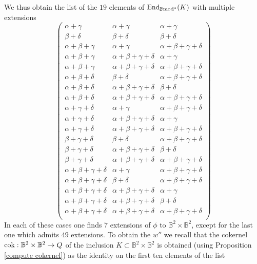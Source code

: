 \documentclass[12pt]{article}
\def\End{{\rm End}}
\def\scoker{{\rm cok}}
\def\B{{\mathbb B}}
\def\End{{\mbox{End}}}
\def\b2{{\rm \B mod^{\mathfrak s}}}
\begin{document}
We thus obtain the  list of the $19$ elements of $\End_\b2(K)$ with multiple extensions
$$
\left(
\begin{array}{ccc}
 \alpha +\gamma  & \alpha +\gamma  & \alpha +\gamma  \\
 \beta +\delta  & \beta +\delta  & \beta +\delta  \\
 \alpha +\beta +\gamma  & \alpha +\gamma  & \alpha +\beta +\gamma +\delta  \\
 \alpha +\beta +\gamma  & \alpha +\beta +\gamma +\delta  & \alpha +\gamma  \\
 \alpha +\beta +\gamma  & \alpha +\beta +\gamma +\delta  & \alpha +\beta +\gamma +\delta  \\
 \alpha +\beta +\delta  & \beta +\delta  & \alpha +\beta +\gamma +\delta  \\
 \alpha +\beta +\delta  & \alpha +\beta +\gamma +\delta  & \beta +\delta  \\
 \alpha +\beta +\delta  & \alpha +\beta +\gamma +\delta  & \alpha +\beta +\gamma +\delta  \\
 \alpha +\gamma +\delta  & \alpha +\gamma  & \alpha +\beta +\gamma +\delta  \\
 \alpha +\gamma +\delta  & \alpha +\beta +\gamma +\delta  & \alpha +\gamma  \\
 \alpha +\gamma +\delta  & \alpha +\beta +\gamma +\delta  & \alpha +\beta +\gamma +\delta  \\
 \beta +\gamma +\delta  & \beta +\delta  & \alpha +\beta +\gamma +\delta  \\
 \beta +\gamma +\delta  & \alpha +\beta +\gamma +\delta  & \beta +\delta  \\
 \beta +\gamma +\delta  & \alpha +\beta +\gamma +\delta  & \alpha +\beta +\gamma +\delta  \\
 \alpha +\beta +\gamma +\delta  & \alpha +\gamma  & \alpha +\beta +\gamma +\delta  \\
 \alpha +\beta +\gamma +\delta  & \beta +\delta  & \alpha +\beta +\gamma +\delta  \\
 \alpha +\beta +\gamma +\delta  & \alpha +\beta +\gamma +\delta  & \alpha +\gamma  \\
 \alpha +\beta +\gamma +\delta  & \alpha +\beta +\gamma +\delta  & \beta +\delta  \\
 \alpha +\beta +\gamma +\delta  & \alpha +\beta +\gamma +\delta  & \alpha +\beta +\gamma +\delta \\
\end{array}
\right)
$$
In each of these cases one finds $7$ extensions of $\phi$ to $\B^2\times \B^2$, except for the last one which admits $49$ extensions. To obtain the $w''$ we recall that the cokernel $\scoker:\B^2\times \B^2\to Q$ of the inclusion $K\subset \B^2\times \B^2$ is obtained (using Proposition \ref{compute cokernel}) as the identity on the first ten elements of the list 
\end{document}

